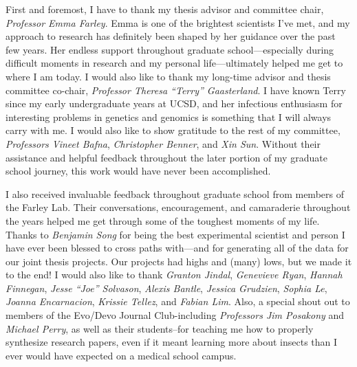 \documentclass[11pt]{formatting-template}
\begin{document}

\tableofcontents
\listoffigures
\listoftables

\begin{acknowledgements}
	First and foremost, I have to thank my thesis advisor and committee chair, \textit{Professor Emma Farley}. Emma is one of the brightest scientists I've met, and my approach to research has definitely been shaped by her guidance over the past few years. Her endless support throughout graduate school—especially during difficult moments in research and my personal life—ultimately helped me get to where I am today. I would also like to thank my long-time advisor and thesis committee co-chair, \textit{Professor Theresa “Terry” Gaasterland}. I have known Terry since my early undergraduate years at UCSD, and her infectious enthusiasm for interesting problems in genetics and genomics is something that I will always carry with me. I would also like to show gratitude to the rest of my committee, \textit{Professors Vineet Bafna}, \textit{Christopher Benner}, and \textit{Xin Sun}. Without their assistance and helpful feedback throughout the later portion of my graduate school journey, this work would have never been accomplished. 
	
	I also received invaluable feedback throughout graduate school from members of the Farley Lab. Their conversations, encouragement, and camaraderie throughout the years helped me get through some of the toughest moments of my life. Thanks to \textit{Benjamin Song} for being the best experimental scientist and person I have ever been blessed to cross paths with—and for generating all of the data for our joint thesis projects. Our projects had highs and (many) lows, but we made it to the end! I would also like to thank \textit{Granton Jindal}, \textit{Genevieve Ryan}, \textit{Hannah Finnegan}, \textit{Jesse “Joe” Solvason}, \textit{Alexis Bantle}, \textit{Jessica Grudzien}, \textit{Sophia Le}, \textit{Joanna Encarnacion}, \textit{Krissie Tellez}, and \textit{Fabian Lim}. Also, a special shout out to members of the Evo/Devo Journal Club-including \textit{Professors Jim Posakony} and \textit{Michael Perry}, as well as their students–for teaching me how to properly synthesize research papers, even if it meant learning more about insects than I ever would have expected on a medical school campus.
	

\end{acknowledgements}
\end{document}
